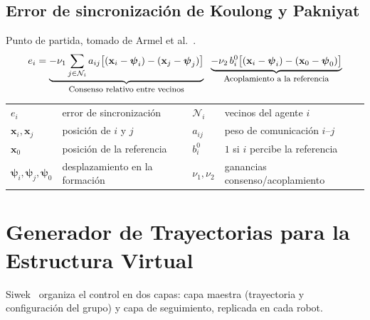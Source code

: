 \subsection{Error de sincronización de Koulong y Pakniyat}
Punto de partida, tomado de Armel et al.~\cite{koulong2024distributed}.
\begin{equation*}
    e_i =
    \underbrace{-\nu_1 \sum_{j \in \mathcal{N}_i} a_{ij}\big[(\mathbf{x}_i-\boldsymbol{\psi}_i)-(\mathbf{x}_j-\boldsymbol{\psi}_j)\big]}_{\text{\footnotesize Consenso relativo entre vecinos}}
    \;\;
    \underbrace{-\nu_2\, b_i^0\big[(\mathbf{x}_i-\boldsymbol{\psi}_i)-(\mathbf{x}_0-\boldsymbol{\psi}_0)\big]}_{\text{\footnotesize Acoplamiento a la referencia}}
\end{equation*}

{\footnotesize
\noindent
\begin{tabular}{l@{\ }l@{\qquad}l@{\ }l}
$e_i$ & error de sincronización & $\mathcal{N}_i$ & vecinos del agente $i$ \\
$\mathbf{x}_i,\mathbf{x}_j$ & posición de $i$ y $j$ & $a_{ij}$ & peso de comunicación $i$--$j$ \\
$\mathbf{x}_0$ & posición de la referencia & $b_i^0$ & $1$ si $i$ percibe la referencia \\
$\boldsymbol{\psi}_i,\boldsymbol{\psi}_j,\boldsymbol{\psi}_0$ & desplazamiento en la formación & $\nu_1,\nu_2$ & ganancias consenso/acoplamiento \\
\end{tabular}
}

\section{Generador de Trayectorias para la Estructura Virtual}

Siwek~\cite{siwek2024consensus} organiza el control en dos capas: capa maestra (trayectoria y configuración del grupo) y capa de seguimiento, replicada en cada robot.

